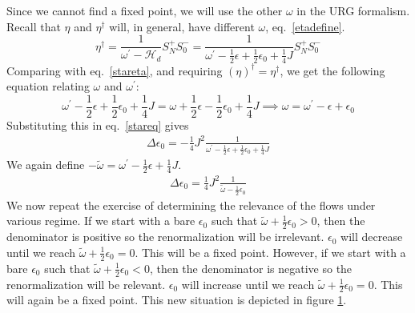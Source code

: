\documentclass[twoside,11pt]{report}
\numberwithin{equation}{section}
\begin{document}
\begin{figure}
	\label{star3}
\end{figure}
\\\\Since we cannot find a fixed point, we will use the other \(\omega\) in the URG formalism. Recall that \(\eta\) and \(\eta^\dagger\) will, in general, have different \(\omega\), eq.~\ref{etadefine}.
\begin{equation}
	\eta^\dagger = \frac{1}{\omega^\prime - \mathcal{H}_d}S_N^+ S_0^- = \frac{1}{\omega^\prime - \frac{1}{2}\epsilon + \frac{1}{2}\epsilon_0 + \frac{1}{4}J}S_N^+ S_0^-
\end{equation}
Comparing with eq.~\ref{stareta}, and requiring \(\left(\eta\right)^\dagger = \eta^\dagger\), we get the following equation relating \(\omega\) and \(\omega^\prime\):
\begin{equation}
	\omega^\prime - \frac{1}{2}\epsilon + \frac{1}{2}\epsilon_0 + \frac{1}{4}J = \omega + \frac{1}{2}\epsilon - \frac{1}{2}\epsilon_0 + \frac{1}{4}J \implies \omega = \omega^\prime - \epsilon + \epsilon_0
\end{equation}
Substituting this in eq.~\ref{stareq} gives
\begin{equation}\begin{aligned}
	\Delta \epsilon_0 = -\frac{1}{4}J^2 \frac{1}{\omega^\prime - \frac{1}{2}\epsilon + \frac{1}{2}\epsilon_0 + \frac{1}{4}J}
\end{aligned}\end{equation}
We again define \(-\tilde \omega = \omega^\prime - \frac{1}{2}\epsilon + \frac{1}{4}J\).
\begin{equation}\begin{aligned}
	\Delta \epsilon_0 = \frac{1}{4}J^2 \frac{1}{\tilde \omega - \frac{1}{2}\epsilon_0}
\end{aligned}\end{equation}
We now repeat the exercise of determining the relevance of the flows under various regime. If we start with a bare \(\epsilon_0\) such that \(\tilde \omega + \frac{1}{2}\epsilon_0 > 0\), then the denominator is positive so the renormalization will be irrelevant. \(\epsilon_0\) will decrease until we reach \(\tilde \omega + \frac{1}{2}\epsilon_0 = 0\). This will be a fixed point. However, if we start with a bare \(\epsilon_0\) such that \(\tilde \omega + \frac{1}{2}\epsilon_0 < 0\), then the denominator is negative so the renormalization will be relevant. \(\epsilon_0\) will increase until we reach \(\tilde \omega + \frac{1}{2}\epsilon_0 = 0\). This will again be a fixed point. This new situation is depicted in figure \ref{star3}.
\end{document}

